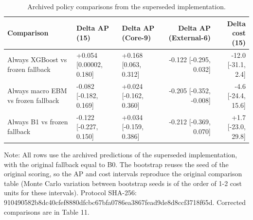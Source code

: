 \documentclass[preprint,12pt,authoryear]{elsarticle}
\begin{document}
\begin{table}[!htbp]
\centering
\scriptsize
\setlength{\tabcolsep}{3pt}
\caption{Archived policy comparisons from the superseded implementation.}
\label{tab:archdiff}
\begin{tabular}{lllrr}
\toprule
Comparison & Delta AP (15) & Delta AP (Core-9) & Delta AP (External-6) & Delta cost (15) \\
\midrule
Always XGBoost vs frozen fallback & +0.054 [0.00002, 0.180] & +0.168 [0.063, 0.312] & -0.122 [-0.295, 0.032] & -12.0 [-31.1, 2.4] \\
Always macro EBM vs frozen fallback & -0.082 [-0.182, 0.169] & +0.024 [-0.162, 0.360] & -0.205 [-0.352, -0.008] & -4.6 [-24.4, 15.6] \\
Always B1 vs frozen fallback & -0.122 [-0.227, 0.150] & +0.034 [-0.159, 0.386] & -0.212 [-0.369, 0.070] & +1.7 [-23.0, 29.8] \\
\bottomrule
\end{tabular}
\par\vspace{2pt}\parbox{0.95\linewidth}{\scriptsize Note: All rows use the archived predictions of the superseded implementation, with the original fallback equal to B0. The bootstrap reuses the seed of the original scoring, so the AP and cost intervals reproduce the original comparison table (Monte Carlo variation between bootstrap seeds is of the order of 1-2 cost units for these intervals). Protocol SHA-256: 910490582b8dc40cfef8880dfcbc67bfa0786ea3867fead9de8d8ccf3718f65d. Corrected comparisons are in Table 11.}
\end{table}
\end{document}
